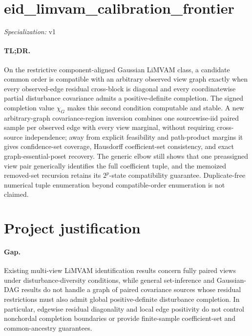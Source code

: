 \documentclass{article}
\begin{document}
\sloppy

\section*{eid\_\allowbreak{}limvam\_\allowbreak{}calibration\_\allowbreak{}frontier}

\noindent\textit{Specialization:} v1\par

\paragraph{TL;DR.} On the restrictive component-aligned Gaussian LiMVAM class, a candidate common order is compatible with an arbitrary observed view graph exactly when every observed-edge residual cross-block is diagonal and every coordinatewise partial disturbance covariance admits a positive-definite completion. The signed completion value \(\chi_G\) makes this second condition computable and stable. A new arbitrary-graph covariance-region inversion combines one sourcewise-iid paired sample per observed edge with every view marginal, without requiring cross-source independence; away from explicit feasibility and path-product margins it gives confidence-set coverage, Hausdorff coefficient-set consistency, and exact graph-essential-poset recovery. The generic elbow still shows that one preassigned view pair generically identifies the full coefficient tuple, and the memoized removed-set recursion retains its \(2^p\)-state compatibility guarantee. Duplicate-free numerical tuple enumeration beyond compatible-order enumeration is not claimed.

\section{Project justification}

\paragraph{Gap.} Existing multi-view LiMVAM identification results concern fully paired views under disturbance-diversity conditions, while general set-inference and Gaussian-DAG results do not handle a graph of paired covariance sources whose residual restrictions must also admit global positive-definite disturbance completion. In particular, edgewise residual diagonality and local edge positivity do not control nonchordal completion boundaries or provide finite-sample coefficient-set and common-ancestry guarantees.
\end{document}
